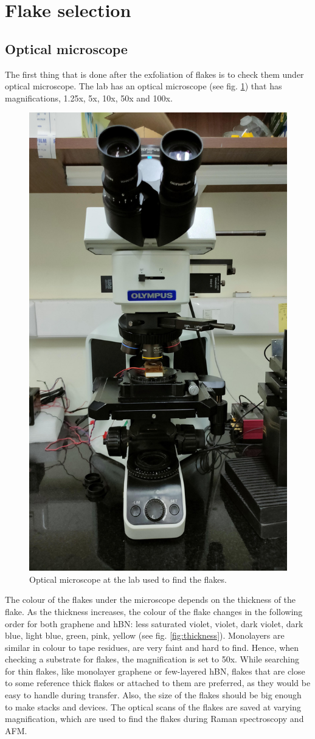 \section{Flake selection}

\subsection{Optical microscope}

The first thing that is done after the exfoliation of flakes is to check them under optical microscope. The lab has an optical microscope (see fig. \ref{fig:micro}) that has magnifications, 1.25x, 5x, 10x, 50x and 100x.

\begin{figure}[H]
	\centering
	\includegraphics[width=0.5\linewidth]{figures/micro.jpg}
	\caption{Optical microscope at the lab used to find the flakes.}
	\label{fig:micro}
\end{figure}

The colour of the flakes under the microscope depends on the thickness of the flake. As the thickness increases, the colour of the flake changes in the following order for both graphene and hBN: less saturated violet, violet, dark violet, dark blue, light blue, green, pink, yellow (see fig. \ref{fig:thickness}). Monolayers are similar in colour to tape residues, are very faint and hard to find. Hence, when checking a substrate for flakes, the magnification is set to 50x. While searching for thin flakes, like monolayer graphene or few-layered hBN, flakes that are close to some reference thick flakes or attached to them are preferred, as they would be easy to handle during transfer. Also, the size of the flakes should be big enough to make stacks and devices. The optical scans of the flakes are saved at varying magnification, which are used to find the flakes during Raman spectroscopy and AFM.

